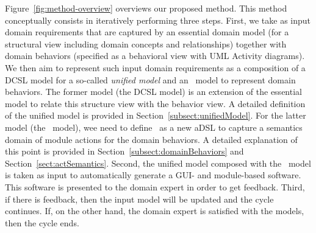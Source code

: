 Figure~\ref{fig:method-overview} overviews our proposed method. This method conceptually consists in iteratively performing three steps. First, we take as input domain requirements that are captured by an essential domain model (for a structural view including domain concepts and relationships) together with domain behaviors (specified as a behavioral view with UML Activity diagrams). We then aim to represent such input domain requirements as a composition of a DCSL model for a so-called \textit{unified model} and an \agl~model to represent domain behaviors. The former model (the DCSL model) is an extension of the essential model to relate this structure view with the behavior view. A detailed definition of the unified model is provided in Section~\ref{subsect:unifiedModel}. For the latter model (the \agl~model), wee need to define \agl~as a new aDSL to capture a semantics domain of module actions for the domain behaviors. %
A detailed explanation of this point is provided in Section~\ref{subsect:domainBehaviors} and Section~\ref{sect:actSemantics}. %
%
%
%
Second, the unified model composed with the \agl~model is taken as input to automatically generate a GUI- and module-based software. This software is presented to the domain expert in order to get feedback. %
%
Third, if there is feedback, then the input model will be updated and the cycle continues. If, on the other hand, the domain expert is satisfied with the models, then the cycle ends.

